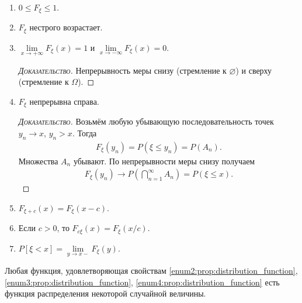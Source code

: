 \documentclass[../main.tex]{subfiles}
\begin{document}
\begin{prop*}\
 \begin{enumerate}
  \item $0 \leqslant F_{\xi} \leqslant 1$.
  \item \label{enum2:prop:distribution_function} $F_{\xi}$  нестрого возрастает.
  \item \label{enum3:prop:distribution_function} $\lim\limits_{x \to +\infty} F_{\xi}(x) = 1$  и $\lim\limits_{x \to -\infty} F_{\xi}(x) = 0$.
   \begin{proof}[\normalfont\textsc{Доказательство}]
    Непрерывность меры снизу (стремление к $\varnothing$) и сверху (стремление к $\Omega$).
   \end{proof}
  \item \label{enum4:prop:distribution_function} $F_{\xi}$  непрерывна справа.
   \begin{proof}[\normalfont\textsc{Доказательство}]
    Возьмём любую убывающую последовательность точек $y_n \to x$, $y_n > x$. Тогда
    \begin{align*}
     F_{\xi}(y_n) = P(\xi \leqslant y_n) = P(A_n)
    .\end{align*} Множества $A_n$ убывают. По непрерывности меры снизу получаем
    \begin{align*}
     F_{\xi}(y_n) \to P \left( \bigcap_{n=1}^{\infty} A_n \right) = P(\xi \leqslant x).
    \end{align*} 
   \end{proof}
  \item $F_{\xi + c}(x) = F_{\xi}(x - c)$.
  \item Если $c > 0$, то $F_{c\xi}(x) = F_{\xi}(x / c)$.
  \item $P[\xi < x] = \lim\limits_{y \to x-} F_{\xi}(y)$.
 \end{enumerate}
\end{prop*}
\begin{remrk}
 Любая функция, удовлетворяющая свойствам \ref{enum2:prop:distribution_function}, \ref{enum3:prop:distribution_function}, \ref{enum4:prop:distribution_function} есть функция распределения некоторой случайной величины.
\end{remrk}
\end{document}
